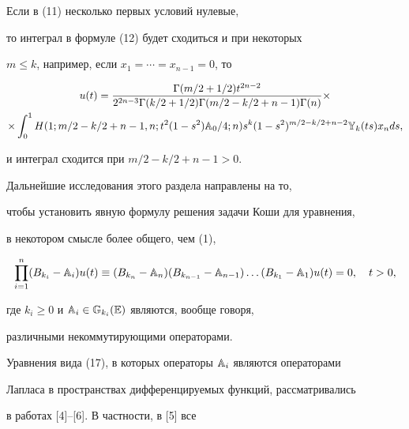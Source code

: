 \begin{note} Если в (11) несколько первых условий нулевые, 


то интеграл в формуле (12) будет сходиться и при некоторых  


$m\le k$, например, если $x_1=\dotsb=x_{n-1}=0$, то 


\begin{multline*} 


u(t)=\frac{\Gamma(m/2+1/2)t^{2n-2}} 


{2^{2n-3}\Gamma(k/2+1/2)\Gamma(m/2-k/2+n-1)\Gamma(n)}\times \\ 


% 


\times\int^1_0 H(1;m/2-k/2+n-1,n;t^2(1-s^2)\Bbb A_0/4;n) 


s^k(1-s^2)^{m/2-k/2+n-2}\Bbb Y_k(ts)x_n ds,


\end{multline*} 


и интеграл сходится при $m/2-k/2+n-1>0$. 


\end{note} 


 


Дальнейшие исследования этого раздела направлены на то,  


чтобы установить явную формулу решения задачи Коши для уравнения,  


в некотором смысле более общего, чем (1),


\begin{equation} 


\prod^n_{i=1}(B_{k_i}-\Bbb A_i)u(t)\equiv 


(B_{k_n}-\Bbb A_n)(B_{k_{n-1}}-\Bbb A_{n-1})\dotsc 


(B_{k_1}-\Bbb A_1)u(t)=0,\quad t>0, 


\end{equation} 


где $k_i\ge 0$ и $\Bbb A_i\in\Bbb G_{k_i}(\Bbb E)$ являются, вообще говоря, 


различными некоммутирующими операторами. 


 


Уравнения вида (17), в которых операторы $\Bbb A_i$ являются операторами 


Лапласа в пространствах дифференцируемых функций, рассматривались 


в работах [4]--[6]. В частности, в [5] все  


